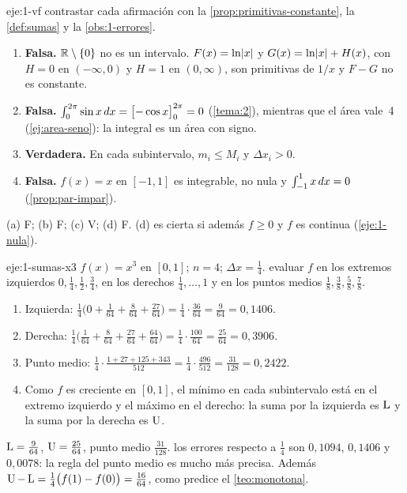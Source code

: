\begin{solucion}{eje:1-vf}
\planteamiento contrastar cada afirmación con la \cref{prop:primitivas-constante}, la \cref{def:sumas} y la \cref{obs:1-errores}.
\pasos
\begin{enumerate}[label=(\alph*)]
  \item \textbf{Falsa.} $\mathbb{R}\setminus\{0\}$ no es un intervalo. $F(x)=\ln\lvert x\rvert$ y $G(x)=\ln\lvert x\rvert+H(x)$, con $H=0$ en $(-\infty,0)$ y $H=1$ en $(0,\infty)$, son primitivas de $1/x$ y $F-G$ no es constante.
  \item \textbf{Falsa.} $\int_0^{2\pi}\sin x\mathop{}\!d x=\bigl[-\cos x\bigr]_{0}^{2\pi}=0$ (\cref{tema:2}), mientras que el área vale~4 (\cref{ej:area-seno}): la integral es un área con signo.
  \item \textbf{Verdadera.} En cada subintervalo, $m_i\le M_i$ y $\Delta x_i>0$.
  \item \textbf{Falsa.} $f(x)=x$ en $[-1,1]$ es integrable, no nula y $\int_{-1}^{1}x\mathop{}\!d x=0$ (\cref{prop:par-impar}).
\end{enumerate}
\resultado (a) F; (b) F; (c) V; (d) F.
\comprobacion (d) es cierta si además $f\ge0$ y $f$ es continua (\cref{eje:1-nula}).
\end{solucion}

\begin{solucion}{eje:1-sumas-x3}
\datos $f(x)=x^{3}$ en $[0,1]$; $n=4$; $\Delta x=\frac14$.
\planteamiento evaluar $f$ en los extremos izquierdos $0,\frac14,\frac12,\frac34$, en los derechos $\frac14,\dots,1$ y en los puntos medios $\frac18,\frac38,\frac58,\frac78$.
\pasos
\begin{enumerate}[label=\arabic*.]
  \item Izquierda: $\frac14\bigl(0+\frac{1}{64}+\frac{8}{64}+\frac{27}{64}\bigr)=\frac14\cdot\frac{36}{64}=\frac{9}{64}=0{,}1406$.
  \item Derecha: $\frac14\bigl(\frac{1}{64}+\frac{8}{64}+\frac{27}{64}+\frac{64}{64}\bigr)=\frac14\cdot\frac{100}{64}=\frac{25}{64}=0{,}3906$.
  \item Punto medio: $\frac14\cdot\frac{1+27+125+343}{512}=\frac14\cdot\frac{496}{512}=\frac{31}{128}=0{,}2422$.
  \item Como $f$ es creciente en $[0,1]$, el mínimo en cada subintervalo está en el extremo izquierdo y el máximo en el derecho: la suma por la izquierda es $\operatorname{L}$ y la suma por la derecha es $\operatorname{U}$.
\end{enumerate}
\resultado $\operatorname{L}=\frac{9}{64}$, $\operatorname{U}=\frac{25}{64}$, punto medio $\frac{31}{128}$.
\comprobacion los errores respecto a $\frac14$ son $0{,}1094$, $0{,}1406$ y $0{,}0078$: la regla del punto medio es mucho más precisa. Además $\operatorname{U}-\operatorname{L}=\frac14\bigl(f(1)-f(0)\bigr)=\frac{16}{64}$, como predice el \cref{teo:monotona}.
\end{solucion}

